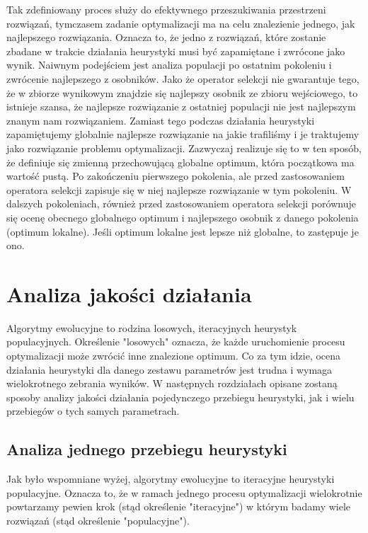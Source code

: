 \documentclass[twoside]{iisthesis}
\begin{document}
Tak zdefiniowany proces służy do efektywnego przeszukiwania przestrzeni rozwiązań, tymczasem zadanie optymalizacji ma na celu znalezienie jednego, jak najlepszego rozwiązania. Oznacza to, że jedno z rozwiązań, które zostanie zbadane w trakcie działania heurystyki musi być zapamiętane i zwrócone jako wynik. Naiwnym podejściem jest analiza populacji po ostatnim pokoleniu i zwrócenie najlepszego z osobników. Jako że operator selekcji nie gwarantuje tego, że w zbiorze wynikowym znajdzie się najlepszy osobnik ze zbioru wejściowego, to istnieje szansa, że najlepsze rozwiązanie z ostatniej populacji nie jest najlepszym znanym nam rozwiązaniem. Zamiast tego podczas działania heurystyki zapamiętujemy globalnie najlepsze rozwiązanie na jakie trafiliśmy i je traktujemy jako rozwiązanie problemu optymalizacji. Zazwyczaj realizuje się to w ten sposób, że definiuje się zmienną przechowującą globalne optimum, która początkowa ma wartość pustą. Po zakończeniu pierwszego pokolenia, ale przed zastosowaniem operatora selekcji zapisuje się w niej najlepsze rozwiązanie w tym pokoleniu. W dalszych pokoleniach, również przed zastosowaniem operatora selekcji porównuje się ocenę obecnego globalnego optimum i najlepszego osobnik z danego pokolenia (optimum lokalne). Jeśli optimum lokalne jest lepsze niż globalne, to zastępuje je ono.

\section{Analiza jakości działania}

Algorytmy ewolucyjne to rodzina losowych, iteracyjnych heurystyk populacyjnych. Określenie "losowych" oznacza, że każde uruchomienie procesu optymalizacji może zwrócić inne znalezione optimum. Co za tym idzie, ocena działania heurystyki dla danego zestawu parametrów jest trudna i wymaga wielokrotnego zebrania wyników. W następnych rozdziałach opisane zostaną sposoby analizy jakości działania pojedynczego przebiegu heurystyki, jak i wielu przebiegów o tych samych parametrach.

\subsection{Analiza jednego przebiegu heurystyki}

Jak było wspomniane wyżej, algorytmy ewolucyjne to iteracyjne heurystyki populacyjne. Oznacza to, że w ramach jednego procesu optymalizacji wielokrotnie powtarzamy pewien krok (stąd określenie "iteracyjne") w którym badamy wiele rozwiązań (stąd określenie "populacyjne").
\end{document}
